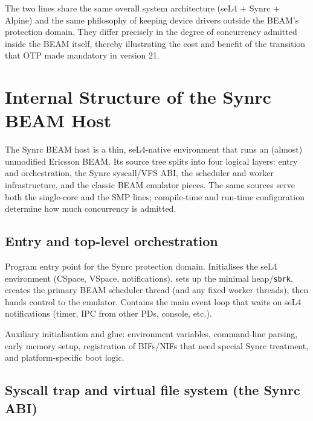 \documentclass{article}
\begin{document}
The two lines share the same overall system architecture (seL4 + Synrc + Alpine) and the same philosophy of keeping device drivers outside the BEAM's protection domain.
They differ precisely in the degree of concurrency admitted inside the BEAM itself, thereby illustrating the cost and benefit of the transition that OTP made mandatory in version 21.

\section{Internal Structure of the Synrc BEAM Host}

The Synrc BEAM host is a thin, seL4-native environment that runs an (almost) unmodified Ericsson BEAM.
Its source tree splits into four logical layers: entry and orchestration, the Synrc syscall/VFS ABI, the scheduler and worker infrastructure, and the classic BEAM emulator pieces.
The same sources serve both the single-core and the SMP lines; compile-time and run-time configuration determine how much concurrency is admitted.

\subsection{Entry and top-level orchestration}

\begin{description}[style=nextline]
  \item[\texttt{synrc\_main.c}]
    Program entry point for the Synrc protection domain.
    Initialises the seL4 environment (CSpace, VSpace, notifications), sets up the minimal heap/\texttt{sbrk}, creates the primary BEAM scheduler thread (and any fixed worker threads), then hands control to the emulator.
    Contains the main event loop that waits on seL4 notifications (timer, IPC from other PDs, console, etc.).

  \item[\texttt{beam\_aux.c}]
    Auxiliary initialisation and glue: environment variables, command-line parsing, early memory setup, registration of BIFs/NIFs that need special Synrc treatment, and platform-specific boot logic.
\end{description}

\subsection{Syscall trap and virtual file system (the Synrc ABI)}
\end{document}
